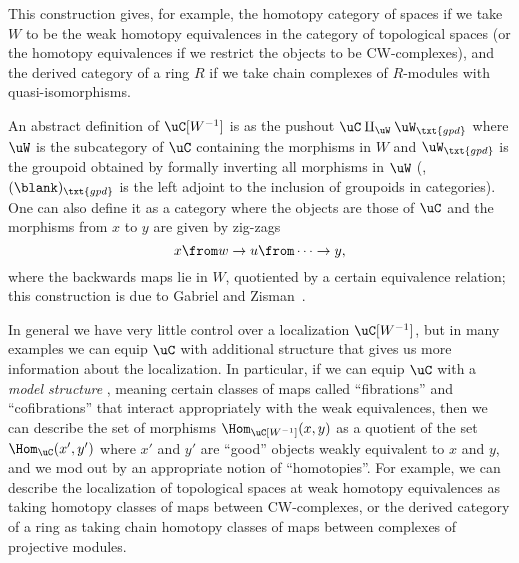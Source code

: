 \documentclass[a4paper,12pt]{article}
\begin{document}
This construction gives, for example, the homotopy category of spaces
if we take $W$ to be the weak homotopy equivalences in the category of
topological spaces (or the homotopy equivalences if we restrict the
objects to be CW-complexes), and the derived category of a ring $R$ if
we take chain complexes of $R$-modules with quasi-isomorphisms.

An abstract definition of $\uC[W^{-1}]$ is as the pushout
$\uC \amalg_{\uW} \uW_{\txt{gpd}}$ where $\uW$ is the subcategory of
$\uC$ containing the morphisms in $W$ and $\uW_{\txt{gpd}}$ is the
groupoid obtained by formally inverting all morphisms in $\uW$ (\ie{},
$(\blank)_{\txt{gpd}}$ is the left adjoint to the inclusion of
groupoids in categories). One can also define it as a category where
the objects are those of $\uC$ and the morphisms from $x$ to $y$ are given by zig-zags
\[ x \from w \to u \from \cdots \to y,\]
where the backwards maps lie in $W$, quotiented by a certain equivalence
relation; this construction is due to Gabriel and
Zisman~\cite{GabrielZisman}.

\begin{remark}
  In general we have very little control over a localization
  $\uC[W^{-1}]$, but in many examples we can equip $\uC$ with
  additional structure that gives us more information about the
  localization. In particular, if we can equip $\uC$ with a
  \emph{model structure} \cite{QuillenHtAlg}, meaning certain classes
  of maps called ``fibrations'' and ``cofibrations'' that interact
  appropriately with the weak equivalences, then we can describe the
  set of morphisms $\Hom_{\uC[W^{-1}]}(x,y)$ as a quotient of the set
  $\Hom_{\uC}(x',y')$ where $x'$ and $y'$ are ``good'' objects weakly
  equivalent to $x$ and $y$, and we mod out by an appropriate notion of
  ``homotopies''. For example, we can describe the localization of
  topological spaces at weak homotopy equivalences as taking homotopy
  classes of maps between CW-complexes, or the derived category of a
  ring as taking chain homotopy classes of maps between complexes of
  projective modules.
\end{remark}
\end{document}
